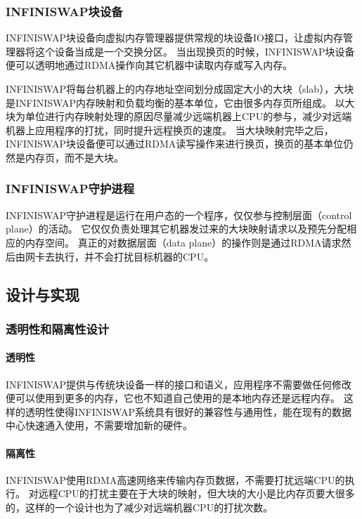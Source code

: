 \subsubsection{INFINISWAP块设备}
INFINISWAP块设备向虚拟内存管理器提供常规的块设备IO接口，让虚拟内存管理器将这个设备当成是一个交换分区。
当出现换页的时候，INFINISWAP块设备便可以透明地通过RDMA操作向其它机器中读取内存或写入内存。

INFINISWAP将每台机器上的内存地址空间划分成固定大小的大块（slab），大块是INFINISWAP内存映射和负载均衡的基本单位，它由很多内存页所组成。
以大块为单位进行内存映射处理的原因尽量减少远端机器上CPU的参与，减少对远端机器上应用程序的打扰，同时提升远程换页的速度。
当大块映射完毕之后，INFINISWAP块设备便可以通过RDMA读写操作来进行换页，换页的基本单位仍然是内存页，而不是大块。

\subsubsection{INFINISWAP守护进程}
INFINISWAP守护进程是运行在用户态的一个程序，仅仅参与控制层面（control plane）的活动。
它仅仅负责处理其它机器发过来的大块映射请求以及预先分配相应的内存空间。
真正的对数据层面（data plane）的操作则是通过RDMA请求然后由网卡去执行，并不会打扰目标机器的CPU。

\subsection{设计与实现}

\subsubsection{透明性和隔离性设计}
\paragraph{透明性}
INFINISWAP提供与传统块设备一样的接口和语义，应用程序不需要做任何修改便可以使用到更多的内存，它也不知道自己使用的是本地内存还是远程内存。
这样的透明性使得INFINISWAP系统具有很好的兼容性与通用性，能在现有的数据中心快速通入使用，不需要增加新的硬件。

\paragraph{隔离性}
INFINISWAP使用RDMA高速网络来传输内存页数据，不需要打扰远端CPU的执行。
对远程CPU的打扰主要在于大块的映射，但大块的大小是比内存页要大很多的，这样的一个设计也为了减少对远端机器CPU的打扰次数。

